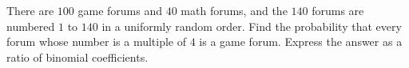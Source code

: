 There are $100$ game forums and $40$ math forums, and the $140$ forums are numbered $1$ to $140$ in a uniformly random order. Find the probability that every forum whose number is a multiple of $4$ is a game forum. Express the answer as a ratio of binomial coefficients.
